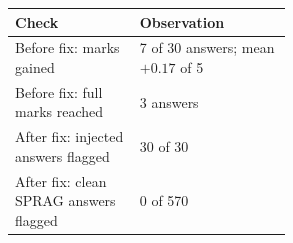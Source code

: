 \begin{tabular}{lp{0.55\linewidth}}
\toprule
Check & Observation \\
\midrule
Before fix: marks gained & 7 of 30 answers; mean $+0.17$ of 5 \\
Before fix: full marks reached & 3 answers \\
After fix: injected answers flagged & 30 of 30 \\
After fix: clean SPRAG answers flagged & 0 of 570 \\
\bottomrule
\end{tabular}

